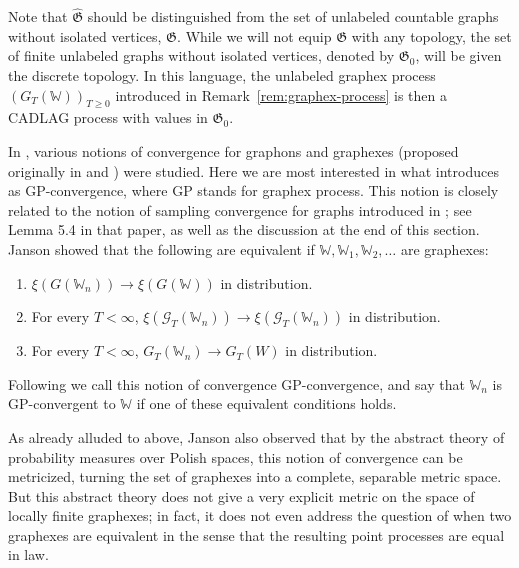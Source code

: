 \documentclass{amsart}
\numberwithin{equation}{section}
\numberwithin{figure}{section}
\theoremstyle{definition}
\theoremstyle{remark}
\newcommand{\cW}{\mathbb{W}}
\newcommand{\cG}{\mathcal{G}}
\newcommand{\hfG}{\hat{\mathfrak G}}
\newcommand{\fG}{\mathfrak G}
\begin{document}
Note that $\hfG$ should be distinguished from the set of unlabeled countable
graphs without isolated vertices, $\fG$. While we will not equip $\fG$ with
any topology, the set of finite unlabeled graphs without isolated vertices,
denoted by $\fG_0$, will be given the discrete topology. In this language,
the unlabeled graphex process $(G_T(\cW))_{T\geq 0}$ introduced in
Remark~\ref{rem:graphex-process} is then a CADLAG process with values in
$\fG_0$.

In \cite{JANSON17}, various notions of convergence for graphons and graphexes
(proposed originally in \cite{BCCH16} and \cite{VR16}) were studied. Here we
are most interested in what \cite{VR16} introduces as GP-convergence, where
GP stands for graphex process. This notion is closely related to the notion
of sampling convergence for graphs introduced in \cite{BCCV17}; see Lemma 5.4
in that paper, as well as the discussion at the end of this section.
 Janson showed that the following are equivalent if
$\cW,\cW_1,\cW_2,\dots$ are graphexes:
\begin{enumerate}
\item $\xi(G(\cW_n))\to \xi(G(\cW))$ in distribution.
\item For every $T<\infty$, $\xi(\cG_T(\cW_n))\to \xi(\cG_T(\cW_n))$ in
    distribution.
\item For every $T<\infty$, $G_T(\cW_n)\to G_T(W)$ in distribution.
\end{enumerate}
Following \cite{VR16} we call this notion of convergence GP-convergence, and
say that $\cW_n$ is GP-convergent to $\cW$ if one of these equivalent
conditions holds.

As already alluded to above, Janson also observed that by the abstract theory
of probability measures over Polish spaces, this notion of convergence can be
metricized, turning the set of graphexes into a complete, separable metric
space. But this abstract theory does not give a very explicit metric on the
space of locally finite graphexes; in fact, it does not even address the
question of when two graphexes are equivalent in the sense that the resulting
point processes are equal in law.
\end{document}
